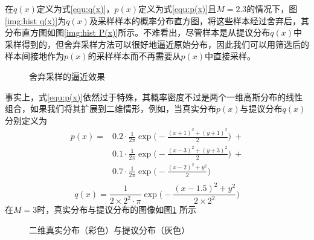 在$q(x)$定义为式\eqref{equ:q(x)}，$p(x)$定义为式\eqref{equ:p(x)}且$M=2.3$的情况下，图\ref{img:hist q(x)}为$q(x)$及采样样本的概率分布直方图，将这些样本经过舍弃后，其分布直方图如图\ref{img:hist P(x)}所示。不难看出，尽管样本是从提议分布$q(x)$中采样得到的，但舍弃采样方法可以很好地逼近原始分布，因此我们可以用筛选后的样本间接地作为$p(x)$的采样样本而不再需要从$p(x)$中直接采样。

\begin{figure}[htbp]
\centering
\subfigure{\label{img:hist q(x)}}\addtocounter{subfigure}{-2}
\subfigure{\label{img:hist P(x)}}\addtocounter{subfigure}{-2}
\caption{舍弃采样的逼近效果}
\vspace{-1em}
\end{figure}

事实上，式\eqref{equ:p(x)}依然过于特殊，其概率密度不过是两个一维高斯分布的线性组合，如果我们将其扩展到二维情形，例如，当真实分布$p(x)$与提议分布$q(x)$分别定义为
\begin{equation}
\begin{split}
p(x) =
& 0.2\cdot \frac{1}{2\pi} \exp\bigg(-\frac{(x+1)^2 + (y+1)^2}{2}\bigg)~ + \\
& 0.1\cdot \frac{1}{2\pi} \exp\bigg(-\frac{(x-3)^2 + (y+3)^2}{2}\bigg)~ +\\
& 0.7\cdot \frac{1}{2\pi} \exp\bigg(-\frac{(x-2)^2 + y^2}{2}\bigg) \\
\end{split}
\end{equation}
\begin{equation}
q(x) = \frac{1}{2\times 2^2 \cdot \pi} \exp\bigg(-\frac{(x-1.5)^2 + y^2}{2\times 2^2}\bigg)
\end{equation}
在$M = 3$时，真实分布与提议分布的图像如图\ref{img:2Dgaussian} 所示

\begin{figure}[htbp]
\centering
\subfigure{\label{img: 2Dgaussian full}}\addtocounter{subfigure}{-2}
\subfigure{\label{img:2Dgaussian part}}\addtocounter{subfigure}{-2}
\caption{二维真实分布（彩色）与提议分布（灰色）}
\label{img:2Dgaussian}
\vspace{-1em}
\end{figure}

